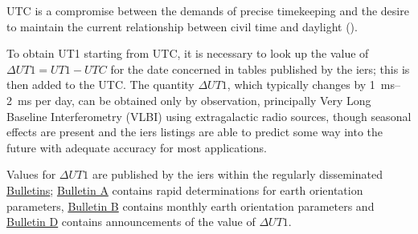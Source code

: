 UTC is a compromise between the demands of precise timekeeping and the desire to 
maintain the current relationship between civil time and daylight (\cite{sofa_18161_tscb}).

To obtain UT1 starting from UTC, it is necessary to look up the value of 
\( \Delta UT1 = UT1 - UTC \) for the date concerned in tables published by the 
\gls{iers}; this is then 
added to the UTC. The quantity \(\Delta UT1\), which typically changes by \SIrange{1}{2}{\milli\second} 
per day, can be obtained only by observation, principally Very Long Baseline
Interferometry (VLBI) using extragalactic radio sources, though seasonal effects 
are present and the \gls{iers} listings are able to predict some way into the future 
with adequate accuracy for most applications.

Values for \( \Delta UT1 \) are published by the \gls{iers} within the regularly disseminated 
\href{https://www.iers.org/IERS/EN/Publications/Bulletins/bulletins.html}{Bulletins}; 
\href{https://datacenter.iers.org/productMetadata.php?id=6}{Bulletin A} contains 
rapid determinations for earth orientation parameters, 
\href{https://datacenter.iers.org/productMetadata.php?id=207}{Bulletin B} 
contains monthly earth orientation parameters and 
\href{https://datacenter.iers.org/productMetadata.php?id=17}{Bulletin D} contains 
announcements of the value of \( \Delta UT1 \).
